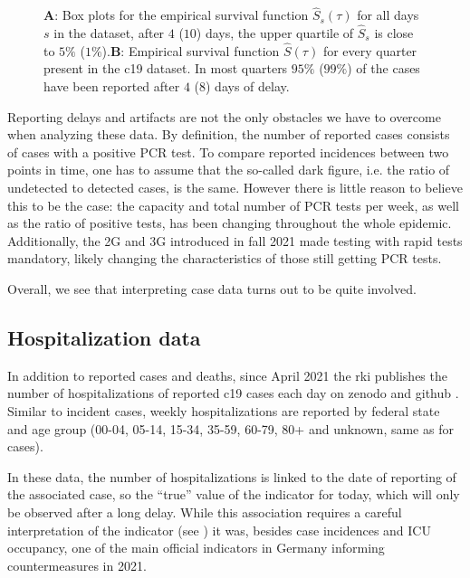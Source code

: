 \begin{figure}
    \resizebox{\textwidth}{!}{%
    }
    \caption{\textbf{A}: Box plots for the empirical survival function $\hat S_{s}(\tau)$ for all days $s$ in the dataset, after $4$ ($10$) days, the upper quartile of $\hat S_{s}$ is close to $5\%$ ($1\%$).\textbf{B}: Empirical survival function $\hat S(\tau)$ for every quarter present in the \acrshort{c19} dataset. In most quarters $95\%$ ($99\%$) of the cases have been reported after $4$ ($8$) days of delay.}
    \label{fig:survival_function_rep_tri_incidences}
\end{figure}

Reporting delays and artifacts are not the only obstacles we have to overcome when analyzing these data. By definition, the number of reported cases consists of cases with a positive PCR test. To compare reported incidences between two points in time, one has to assume that the so-called dark figure, i.e. the ratio of undetected to detected cases, is the same. However there is little reason to believe this to be the case: the capacity and total number of PCR tests per week, as well as the ratio of positive tests, has been changing throughout the whole epidemic. Additionally, the 2G and 3G  introduced in fall 2021 made testing with rapid tests mandatory, likely changing the characteristics of those still getting PCR tests.

Overall, we see that interpreting case data turns out to be quite involved. 

\subsection{Hospitalization data}
In addition to reported cases and deaths, since April 2021 the \acrshort{rki} publishes the number of hospitalizations of reported \acrshort{c19} cases each day on zenodo \citep{RobertKoch-Institut2024COVID19Hospitalisierungen} and github \citep{RobertKoch-Institut2024COVID19Hospitalisierungena}. 
Similar to incident cases, weekly hospitalizations are reported by federal state and age group (00-04, 05-14, 15-34, 35-59, 60-79, 80+ and unknown, same as for cases). 

In these data, the number of hospitalizations is linked to the date of reporting of the associated case, so the ``true'' value of the indicator for today, which will only be observed after a long delay. While this association requires a careful interpretation of the indicator (see ) it was, besides case incidences and ICU occupancy, one of the main official indicators in Germany informing countermeasures in 2021.

